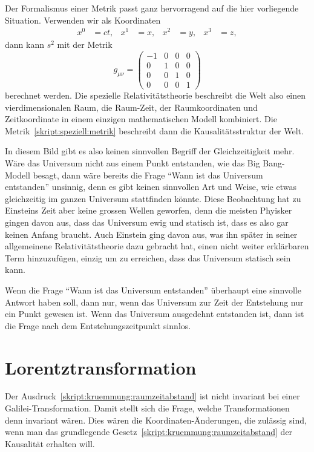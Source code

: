 Der Formalismus einer Metrik passt ganz hervorragend auf die hier
vorliegende Situation.
Verwenden wir als Koordinaten
\begin{align*}
x^0 &= ct,
&
x^1&=x,
&
x^2&=y,
&
x^3&=z,
\end{align*}
dann kann $s^2$ mit der Metrik
\begin{equation}
g_{\mu\nu}
=
\begin{pmatrix}
-1&0&0&0\\
 0&1&0&0\\
 0&0&1&0\\
 0&0&0&1
\end{pmatrix}
\label{skript:speziell:metrik}
\end{equation}
berechnet werden.
Die spezielle Relativitätstheorie beschreibt die Welt also einen
vierdimensionalen Raum, die Raum-Zeit, der Raumkoordinaten und Zeitkoordinate
in einem einzigen mathematischen Modell kombiniert.
Die Metrik~\eqref{skript:speziell:metrik} beschreibt dann die
Kausalitätsstruktur der Welt.

In diesem Bild gibt es also keinen sinnvollen Begriff der Gleichzeitigkeit
mehr.
Wäre das Universum nicht aus einem Punkt entstanden, wie das Big Bang-Modell
besagt, dann wäre bereits die Frage ``Wann ist das Universum entstanden''
unsinnig, denn es gibt keinen sinnvollen Art und Weise, wie etwas gleichzeitig
im ganzen Universum stattfinden könnte.
Diese Beobachtung hat zu Einsteins Zeit aber keine grossen Wellen
geworfen, denn die meisten Phyisker gingen davon aus, dass das Universum
ewig und statisch ist, dass es also gar keinen Anfang braucht.
Auch Einstein ging davon aus, was ihn später in seiner allgemeinene
Relativitätstheorie dazu gebracht hat, einen nicht weiter erklärbaren
Term hinzuzufügen, einzig um zu erreichen, dass das Universum statisch 
sein kann.

Wenn die Frage ``Wann ist das Universum entstanden'' überhaupt eine
sinnvolle Antwort haben soll, dann nur, wenn das Universum zur Zeit
der Entstehung nur ein Punkt gewesen ist.
Wenn das Universum ausgedehnt entstanden ist, dann ist die Frage
nach dem Entstehungszeitpunkt sinnlos.

\section{Lorentztransformation}
Der Ausdruck~\eqref{skript:kruemmung:raumzeitabstand} ist nicht
invariant bei einer Galilei-Transformation.
Damit stellt sich die Frage, welche Transformationen denn
invariant wären.
Dies wären die Koordinaten-Änderungen, die zulässig sind, wenn
man das grundlegende Gesetz~\eqref{skript:kruemmung:raumzeitabstand}
der Kausalität erhalten will.

